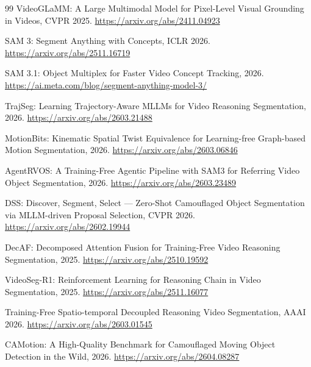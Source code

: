 \documentclass[11pt]{article}
\begin{document}
\begin{thebibliography}{99}
VideoGLaMM: A Large Multimodal Model for Pixel-Level Visual Grounding in Videos, CVPR 2025.\newline
\url{https://arxiv.org/abs/2411.04923}

SAM 3: Segment Anything with Concepts, ICLR 2026.\newline
\url{https://arxiv.org/abs/2511.16719}

SAM 3.1: Object Multiplex for Faster Video Concept Tracking, 2026.\newline
\url{https://ai.meta.com/blog/segment-anything-model-3/}

TrajSeg: Learning Trajectory-Aware MLLMs for Video Reasoning Segmentation, 2026.\newline
\url{https://arxiv.org/abs/2603.21488}

MotionBits: Kinematic Spatial Twist Equivalence for Learning-free Graph-based Motion Segmentation, 2026.\newline
\url{https://arxiv.org/abs/2603.06846}

AgentRVOS: A Training-Free Agentic Pipeline with SAM3 for Referring Video Object Segmentation, 2026.\newline
\url{https://arxiv.org/abs/2603.23489}

DSS: Discover, Segment, Select --- Zero-Shot Camouflaged Object Segmentation via MLLM-driven Proposal Selection, CVPR 2026.\newline
\url{https://arxiv.org/abs/2602.19944}

DecAF: Decomposed Attention Fusion for Training-Free Video Reasoning Segmentation, 2025.\newline
\url{https://arxiv.org/abs/2510.19592}

VideoSeg-R1: Reinforcement Learning for Reasoning Chain in Video Segmentation, 2025.\newline
\url{https://arxiv.org/abs/2511.16077}

Training-Free Spatio-temporal Decoupled Reasoning Video Segmentation, AAAI 2026.\newline
\url{https://arxiv.org/abs/2603.01545}

CAMotion: A High-Quality Benchmark for Camouflaged Moving Object Detection in the Wild, 2026.\newline
\url{https://arxiv.org/abs/2604.08287}

\end{thebibliography}
\end{document}
